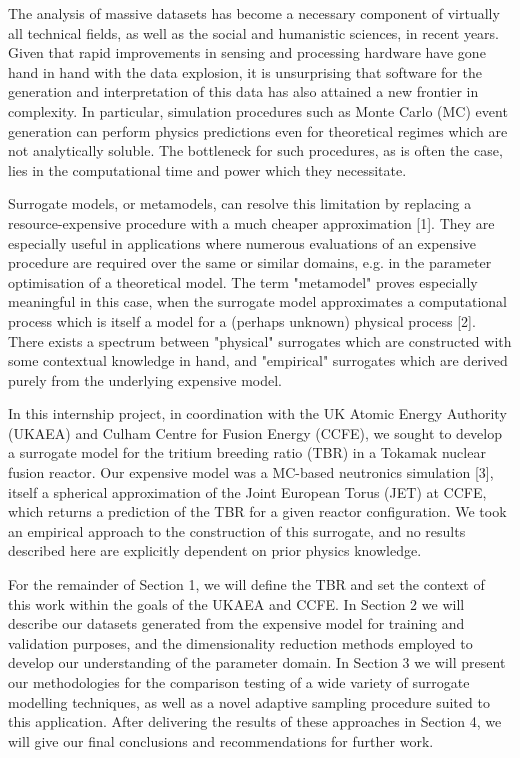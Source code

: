 The analysis of massive datasets has become a necessary component of virtually all technical fields, as well as the social and humanistic sciences, in recent years. Given that rapid improvements in sensing and processing hardware have gone hand in hand with the data explosion, it is unsurprising that software for the generation and interpretation of this data has also attained a new frontier in complexity. In particular, simulation procedures such as Monte Carlo (MC) event generation can perform physics predictions even for theoretical regimes which are not analytically soluble. The bottleneck for such procedures, as is often the case, lies in the computational time and power which they necessitate.

Surrogate models, or metamodels, can resolve this limitation by replacing a resource-expensive procedure with a much cheaper approximation [1]. They are especially useful in applications where numerous evaluations of an expensive procedure are required over the same or similar domains, e.g. in the parameter optimisation of a theoretical model. The term "metamodel" proves especially meaningful in this case, when the surrogate model approximates a computational process which is itself a model for a (perhaps unknown) physical process [2]. There exists a spectrum between "physical" surrogates which are constructed with some contextual knowledge in hand, and "empirical" surrogates which are derived purely from the underlying expensive model. 

In this internship project, in coordination with the UK Atomic Energy Authority (UKAEA) and Culham Centre for Fusion Energy (CCFE), we sought to develop a surrogate model for the tritium breeding ratio (TBR) in a Tokamak nuclear fusion reactor. Our expensive model was a MC-based neutronics simulation [3], itself a spherical approximation of the Joint European Torus (JET) at CCFE, which returns a prediction of the TBR for a given reactor configuration. We took an empirical approach to the construction of this surrogate, and no results described here are explicitly dependent on prior physics knowledge.

For the remainder of Section 1, we will define the TBR and set the context of this work within the goals of the UKAEA and CCFE. In Section 2 we will describe our datasets generated from the expensive model for training and validation purposes, and the dimensionality reduction methods employed to develop our understanding of the parameter domain. In Section 3 we will present our methodologies for the comparison testing of a wide variety of surrogate modelling techniques, as well as a novel adaptive sampling procedure suited to this application. After delivering the results of these approaches in Section 4, we will give our final conclusions and recommendations for further work.

